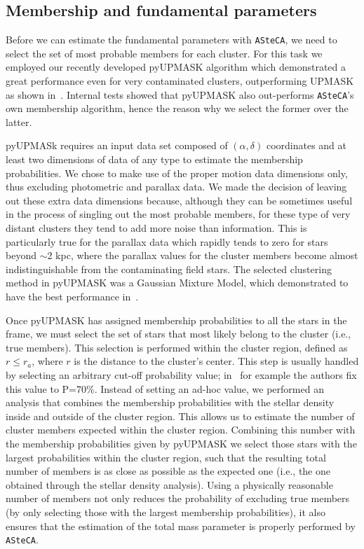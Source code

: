 \documentclass{aa}
\begin{document}
 \subsection{Membership and fundamental parameters}
  \label{ssec:fund_pars}

  Before we can estimate the fundamental parameters with \texttt{ASteCA}, we
  need to select the set of most probable members for each cluster. For this
  task we employed our recently developed pyUPMASK algorithm which demonstrated
  a great performance even for very contaminated clusters, outperforming
  UPMASK~\citep{Krone2014} as shown in~\cite{Pera_2021}. Internal tests
  showed that pyUPMASK also out-performs \texttt{ASteCA}'s own membership
  algorithm, hence the reason why we select the former over the latter.

  pyUPMASk requires an input data set composed of $(\alpha, \delta)$ coordinates
  and at least two dimensions of data of any type to estimate the membership
  probabilities. We chose to make use of the proper motion data dimensions only,
  thus excluding photometric and parallax data.
  We made the decision of leaving out these extra data dimensions because,
  although they can be sometimes useful in the process of singling out the most
  probable members, for these type of very distant clusters they tend to add
  more noise than information.
  This is particularly true for the parallax data which
  rapidly tends to zero for stars beyond $\sim$2 kpc, where the parallax values
  for the cluster members become almost indistinguishable from the contaminating
  field stars. The selected clustering method in pyUPMASK was a Gaussian Mixture
  Model, which demonstrated to have the best performance
  in~\citet[][see Sect. 4]{Pera_2021}.

  Once pyUPMASK has assigned membership probabilities to all the stars in the
  frame, we must select the set of stars that most likely belong to the
  cluster (i.e., true members). This selection is performed within the
  cluster region, defined as $r\leq r_{a}$, where $r$ is the distance to the
  cluster's center.
  This step is usually handled by selecting
  an arbitrary cut-off probability value; in~\cite{Cantat_2020} for example
  the authors fix this value to P=70\%. Instead of setting an ad-hoc value, we
  performed an analysis that combines the membership probabilities with the
  stellar density inside and outside of the cluster region. This allows us to
  estimate the number of cluster members expected within the cluster region.
  Combining this number with the membership probabilities given by pyUPMASK we
  select those stars with the largest probabilities within the cluster region,
  such that the resulting total number of members is as close as possible as the
  expected one (i.e., the one obtained through the stellar density analysis).
  Using a physically reasonable number of members not only reduces the
  probability of excluding true members (by only selecting those with the
  largest membership probabilities), it also ensures that the estimation of the
  total mass parameter is properly performed by \texttt{ASteCA}.\\
\end{document}
